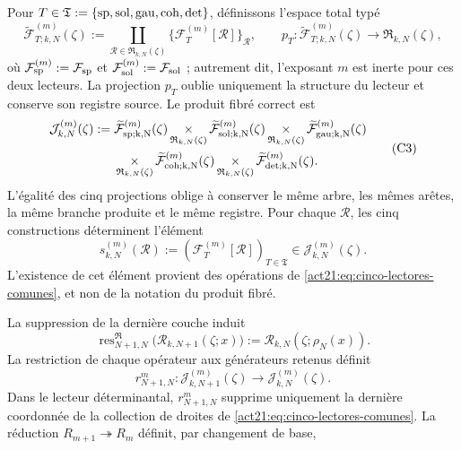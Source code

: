 Pour
\(T\in\mathfrak T:=\{{\rm sp},{\rm sol},{\rm gau},{\rm coh},{\rm det}\}\),
définissons l'espace total typé
\[
 \widetilde{\mathcal F}_{T;k,N}^{(m)}(\zeta)
 :=\coprod_{\mathscr R\in\mathfrak R_{k,N}(\zeta)}
   \{\mathcal F_T^{(m)}[\mathscr R]\}_{\mathscr R},
 \qquad
 p_T:\widetilde{\mathcal F}_{T;k,N}^{(m)}(\zeta)
      \longrightarrow\mathfrak R_{k,N}(\zeta),
\]
où \(\mathcal F_{\rm sp}^{(m)}:=\mathcal F_{\rm sp}\) et \(\mathcal F_{\rm sol}^{(m)}:=\mathcal F_{\rm sol}\) ; autrement dit, l'exposant \(m\) est inerte pour ces deux lecteurs. La projection \(p_T\) oublie uniquement la structure du lecteur et conserve son registre source. Le produit fibré correct est
\[
\begin{aligned}
 \mathcal J_{k,N}^{(m)}(\zeta):={}&
 \widetilde{\mathcal F}_{\rm sp;k,N}^{(m)}(\zeta)
 \mathop{\times}_{\mathfrak R_{k,N}(\zeta)}
 \widetilde{\mathcal F}_{\rm sol;k,N}^{(m)}(\zeta)
 \mathop{\times}_{\mathfrak R_{k,N}(\zeta)}
 \widetilde{\mathcal F}_{\rm gau;k,N}^{(m)}(\zeta)\\
 &\mathop{\times}_{\mathfrak R_{k,N}(\zeta)}
 \widetilde{\mathcal F}_{\rm coh;k,N}^{(m)}(\zeta)
 \mathop{\times}_{\mathfrak R_{k,N}(\zeta)}
 \widetilde{\mathcal F}_{\rm det;k,N}^{(m)}(\zeta).
\end{aligned}
\tag{C3}
\label{act21:eq:constructor-correlativo}
\]
L'égalité des cinq projections oblige à conserver le même arbre, les
mêmes arêtes, la même branche produite et le même registre. Pour chaque
\(\mathscr R\), les cinq constructions déterminent l'élément
\[
 s_{k,N}^{(m)}(\mathscr R)
 :=(\mathcal F_T^{(m)}[\mathscr R])_{T\in\mathfrak T}
 \in\mathcal J_{k,N}^{(m)}(\zeta).
\]
L'existence de cet élément provient des opérations de \eqref{act21:eq:cinco-lectores-comunes}, et non de la notation du produit fibré.

La suppression de la dernière couche induit
\[
 \operatorname{res}^{\mathfrak R}_{N+1,N}
 \bigl(\mathscr R_{k,N+1}(\zeta;x)\bigr)
 :=\mathscr R_{k,N}(\zeta;\rho_N(x)).
\]
La restriction de chaque opérateur aux générateurs retenus définit
\[
 r^m_{N+1,N}:\mathcal J_{k,N+1}^{(m)}(\zeta)
 \longrightarrow\mathcal J_{k,N}^{(m)}(\zeta).
\]
Dans le lecteur déterminantal, \(r^m_{N+1,N}\) supprime uniquement la dernière
coordonnée de la collection de droites de
\eqref{act21:eq:cinco-lectores-comunes}. La réduction
\(R_{m+1}\twoheadrightarrow R_m\) définit, par changement de base,

